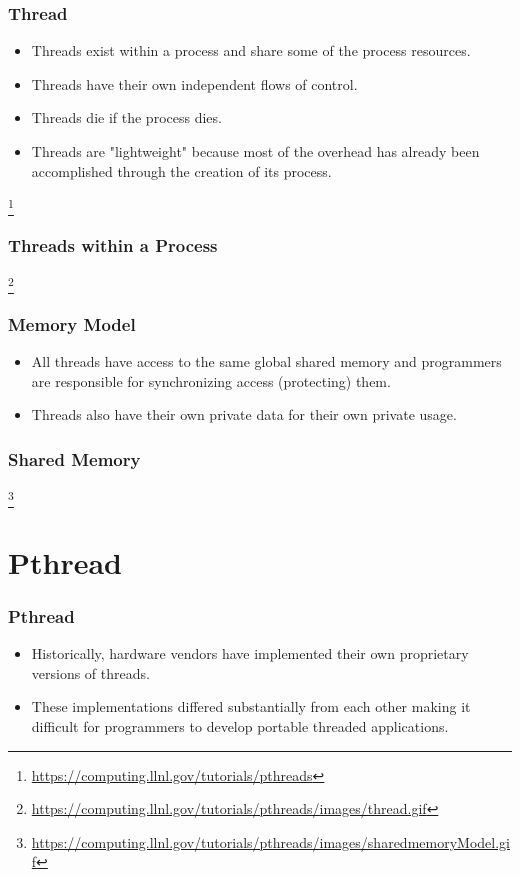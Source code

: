 \documentclass{beamer}
\begin{document}
\begin{frame}
\frametitle{Thread}
\begin{itemize}
\item Threads exist within a process and share some of the process
  resources.
\item Threads have their own independent flows of control.
\item Threads die if the process dies.
\item Threads are "lightweight" because most of the overhead has
  already been accomplished through the creation of its process.
\end{itemize}\footnote{\url{https://computing.llnl.gov/tutorials/pthreads}}
\end{frame}


\begin{frame}
\frametitle{Threads within a Process}
\centerline{}
\footnote{\url{https://computing.llnl.gov/tutorials/pthreads/images/thread.gif}}
\end{frame}

\begin{frame}
\frametitle{Memory Model} 
\begin{itemize}
\item All threads have access to the same global shared memory and
  programmers are responsible for synchronizing access (protecting)
  them.
\item Threads also have their own private data for their own private
  usage.
\end{itemize}
\end{frame}

\begin{frame}
\frametitle{Shared Memory}
\centerline{}
\footnote{\url{https://computing.llnl.gov/tutorials/pthreads/images/sharedmemoryModel.gif}}
\end{frame}


\section{Pthread}

\begin{frame}
\frametitle{Pthread}
\begin{itemize}
\item Historically, hardware vendors have implemented their own
  proprietary versions of threads. 
\item These implementations differed substantially from each other
  making it difficult for programmers to develop portable threaded
  applications.
\end{itemize}
\end{frame}
\end{document}

